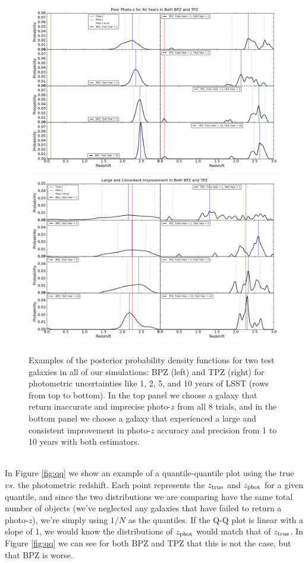 \documentclass[DM,lsstdraft,toc]{lsstdoc}
\begin{document}
\begin{figure}
\begin{center}
\includegraphics[width=13cm]{figures/zpdf_g4.png}
\includegraphics[width=13cm]{figures/zpdf_g7.png}
\caption{Examples of the posterior probability density functions for two test galaxies in all of our simulations: BPZ (left) and TPZ (right) for photometric uncertainties like 1, 2, 5, and 10 years of LSST (rows from top to bottom). In the top panel we choose a galaxy that return inaccurate and imprecise photo-$z$ from all 8 trials, and in the bottom panel we choose a galaxy that experienced a large and consistent improvement in photo-$z$ accuracy and precision from 1 to 10 years with both estimators.  \label{fig:zpdf}}
\end{center}
\end{figure}

\smallskip {} \\
In Figure \ref{fig:qq} we show an example of a quantile-quantile plot using the true $vs.$ the photometric redshift. Each point represents the $z_{\rm true}$ and $z_{\rm phot}$ for a given quantile, and since the two distributions we are comparing have the same total number of objects (we've neglected any galaxies that have failed to return a photo-$z$), we're simply using $1/N$ as the quantiles. If the Q-Q plot is linear with a slope of 1, we would know the distributions of $z_{\rm phot}$ would match that of $z_{\rm true}$. In Figure \ref{fig:qq} we can see for both BPZ and TPZ that this is not the case, but that BPZ is worse.
\end{document}
